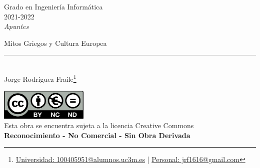 \documentclass[12pt, twoside, openright]{report} %
\begin{document}

\begin{titlepage}
  \begin{sffamily}
    \color{azulUC3M}
    \begin{center}
      \begin{figure}[H] %
      \end{figure}
      \vspace{2.5cm}
      \begin{Large}
        Grado en Ingeniería Informática\\
        2021-2022\\
        \vspace{2cm}
        \textsl{Apuntes}\\
        \bigskip
      \end{Large}
      {\Huge Mitos Griegos y Cultura Europea}\\
      \vspace*{0.5cm}
      \rule{10.5cm}{0.1mm}\\
      \vspace*{0.9cm}
      {\LARGE Jorge Rodríguez Fraile\footnote{\href{mailto:100405951@alumnos.uc3m.es}{Universidad: 100405951@alumnos.uc3m.es}  |  \href{mailto:jrf1616@gmail.com}{Personal: jrf1616@gmail.com}}}\\
      \vspace*{1cm}
    \end{center}
    \vfill
    \color{black}
    \includegraphics[width=4.2cm]{img/creativecommons.png}\\
    Esta obra se encuentra sujeta a la licencia Creative Commons\\ \textbf{Reconocimiento - No Comercial - Sin Obra Derivada}
  \end{sffamily}
\end{titlepage}

\end{document}
